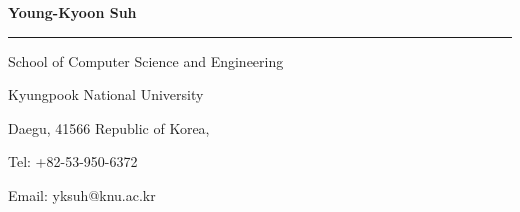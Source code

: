 \documentclass{letter} %
\begin{document}
\signature{Young-Kyoon Suh}           %
\longindentation=0pt                       %
\let\raggedleft\raggedright                %
 
\begin{letter}{
%
}

\begin{flushleft}
{\large\bf Young-Kyoon Suh}
\end{flushleft}
\medskip\hrule height 1pt
\begin{flushright}
\hfill School of Computer Science and Engineering
\end{flushright}
\vspace{-.15in}
\begin{flushright}
\hfill Kyungpook National University 
\end{flushright}
\vspace{-.15in}
\begin{flushright}
\hfill Daegu, 41566 Republic of Korea, 
\end{flushright}
\vspace{-.15in}
\begin{flushright}
\hfill Tel: +82-53-950-6372
\end{flushright}
\vspace{-.15in}
\begin{flushright}
\hfill Email: yksuh@knu.ac.kr
\end{flushright} 

 

\end{letter}
\end{document}
